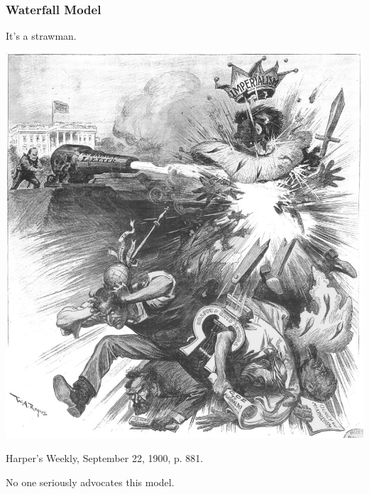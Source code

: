 \begin{frame}
\frametitle{Waterfall Model}

\begin{changemargin}{1cm}
It's a strawman.

\begin{center}
\includegraphics[height=.7\textheight]{images/McKinley_Destroys_Imperialism_Straw_Man}
\end{center}
{\hfill \scriptsize Harper's Weekly, September 22, 1900, p. 881.}

No one seriously advocates this model.\\
\end{changemargin}
\end{frame}

